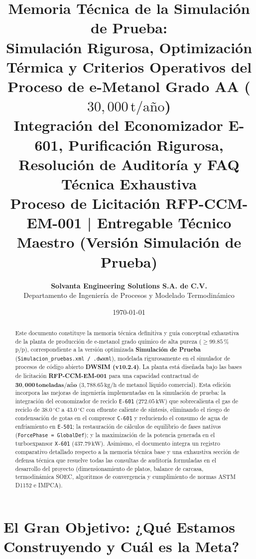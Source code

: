 \documentclass[11pt,a4paper]{article}
\title{\vspace{-1.2cm}
    \textbf{\LARGE \color{solvantablue} Memoria Técnica de la Simulación de Prueba:}\\[0.3cm]
    \textbf{\Large Simulación Rigurosa, Optimización Térmica y Criterios Operativos del Proceso de e-Metanol Grado AA ($30{,}000\,\text{t/año}$)}\\[0.2cm]
    \textbf{\large Integración del Economizador E-601, Purificación Rigurosa, Resolución de Auditoría y FAQ Técnica Exhaustiva}\\[0.4cm]
    \normalsize Proceso de Licitación RFP-CCM-EM-001 | Entregable Técnico Maestro (Versión Simulación de Prueba)
}
\author{\textbf{Solvanta Engineering Solutions S.A. de C.V.}\\
Departamento de Ingeniería de Procesos y Modelado Termodinámico}
\date{\today}
\begin{document}
\maketitle

\begin{abstract}
Este documento constituye la memoria técnica definitiva y guía conceptual exhaustiva de la planta de producción de e-metanol grado químico de alta pureza ($\ge 99.85\,\%$ p/p), correspondiente a la versión optimizada \textbf{Simulación de Prueba} (\texttt{Simulacion\_pruebas.xml / .dwxml}), modelada rigurosamente en el simulador de procesos de código abierto \textbf{DWSIM (v10.2.4)}. La planta está diseñada bajo las bases de licitación \textbf{RFP-CCM-EM-001} para una capacidad contractual de $\mathbf{30{,}000\,\text{toneladas/año}}$ ($3{,}788.65\,\text{kg/h}$ de metanol líquido comercial). Esta edición incorpora las mejoras de ingeniería implementadas en la simulación de prueba: la integración del economizador de reciclo \texttt{E-601} ($272.05\,\text{kW}$) que sobrecalienta el gas de reciclo de $38.0\,^\circ\text{C}$ a $43.0\,^\circ\text{C}$ con efluente caliente de síntesis, eliminando el riesgo de condensación de gotas en el compresor \texttt{C-601} y reduciendo el consumo de agua de enfriamiento en \texttt{E-501}; la restauración de cálculos de equilibrio de fases nativos (\texttt{ForcePhase = GlobalDef}); y la maximización de la potencia generada en el turboexpansor \texttt{X-601} ($437.79\,\text{kW}$). Asimismo, el documento integra un registro comparativo detallado respecto a la memoria técnica base y una exhaustiva sección de defensa técnica que resuelve todas las consultas de auditoría formuladas en el desarrollo del proyecto (dimensionamiento de platos, balance de carcasa, termodinámica SOEC, algoritmos de convergencia y cumplimiento de normas ASTM D1152 e IMPCA).
\end{abstract}

\tableofcontents
\newpage

\section{El Gran Objetivo: ¿Qué Estamos Construyendo y Cuál es la Meta?}
\end{document}
